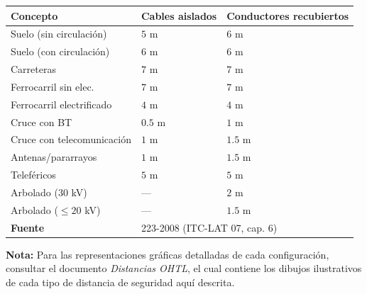 \documentclass[12pt,a4paper]{article}
\begin{document}
\begin{center}
\begin{tabular}{lll}
\toprule
\textbf{Concepto} & \textbf{Cables aislados} & \textbf{Conductores recubiertos} \\
\midrule
Suelo (sin circulación)    & $5$ m                & $6$ m \\
Suelo (con circulación)    & $6$ m                & $6$ m \\
Carreteras                 & $7$ m                & $7$ m \\
Ferrocarril sin elec.      & $7$ m                & $7$ m \\
Ferrocarril electrificado  & $4$ m                & $4$ m \\
Cruce con BT               & $0.5$ m              & $1$ m \\
Cruce con telecomunicación & $1$ m                & $1.5$ m \\
Antenas/pararrayos         & $1$ m                & $1.5$ m \\
Teleféricos                & $5$ m                & $5$ m \\
Arbolado ($30$ kV)         & ---                  & $2$ m \\
Arbolado ($\le 20$ kV)     & ---                  & $1.5$ m \\
\midrule
\textbf{Fuente} & \multicolumn{2}{l}{223-2008 (ITC-LAT 07, cap. 6)} \\
\bottomrule
\end{tabular}
\end{center}

\vspace{1cm}

\noindent\textbf{Nota:} Para las representaciones gráficas detalladas de cada
configuración, consultar el documento \textit{Distancias OHTL}, el cual
contiene los dibujos ilustrativos de cada tipo de distancia de seguridad
aquí descrita.
\end{document}
